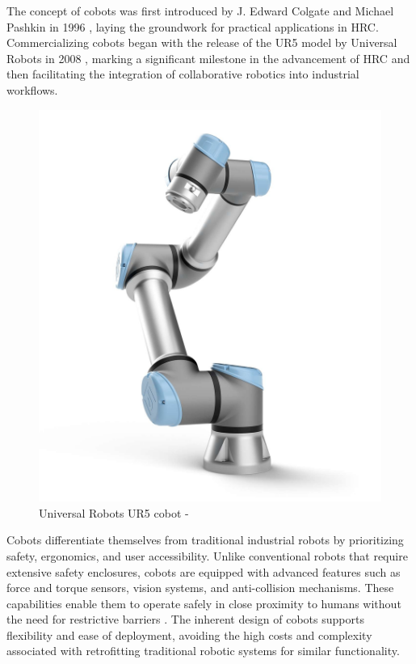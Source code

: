 The concept of cobots was first introduced by J. Edward Colgate and Michael Pashkin in 1996 \cite{cobot-definition}, laying the groundwork for practical applications in \ac{HRC}. Commercializing cobots began with the release of the UR5 model by Universal Robots in 2008 \cite{robotics8040100}, marking a significant milestone in the advancement of \ac{HRC} and then facilitating the integration of collaborative robotics into industrial workflows.

\begin{figure}[!htbp]
    \centering
    \includegraphics[width=0.4\linewidth]{figs/ur5.jpg}
    \caption{Universal Robots UR5 cobot - \cite{jugardUniversalRobots}} 
    \label{fig:ur5}
\end{figure} 


Cobots differentiate themselves from traditional industrial robots by prioritizing safety, ergonomics, and user accessibility. Unlike conventional robots that require extensive safety enclosures, cobots are equipped with advanced features such as force and torque sensors, vision systems, and anti-collision mechanisms. These capabilities enable them to operate safely in close proximity to humans without the need for restrictive barriers \cite{cobots-design}. The inherent design of cobots supports flexibility and ease of deployment, avoiding the high costs and complexity associated with retrofitting traditional robotic systems for similar functionality.


